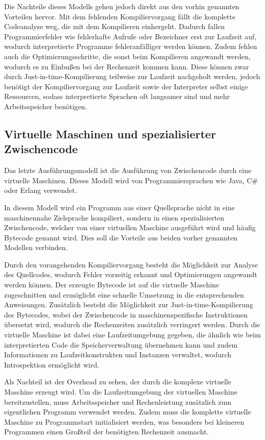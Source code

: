 \documentclass[11pt, parskip=half]{scrartcl}       %
\begin{document}
Die Nachteile dieses Modells gehen jedoch direkt aus den vorhin genannten Vorteilen hervor.
Mit dem fehlenden Kompiliervorgang fällt die komplette Codeanalyse weg, die mit dem Kompilieren einhergeht.
Dadurch fallen Programmierfehler wie fehlerhafte Aufrufe oder Bezeichner erst zur Laufzeit auf, wodurch interpretierte Programme fehleranfälliger werden können.
Zudem fehlen auch die Optimierungsschritte, die sonst beim Kompilieren angewandt werden, wodurch es zu Einbußen bei der Rechenzeit kommen kann.
Diese können zwar durch Just-in-time-Kompilierung teilweise zur Laufzeit nachgeholt werden, jedoch benötigt der Kompiliervorgang zur Laufzeit sowie der Interpreter selbst einige Ressourcen, sodass interpretierte Sprachen oft langsamer sind und mehr Arbeitsspeicher benötigen.\cite{stackoverflow_pros_and_cons_interpreted_languages}

\subsection{Virtuelle Maschinen und spezialisierter Zwischencode}

Das letzte Ausführungsmodell ist die Ausführung von Zwischencode durch eine virtuelle Maschinen.
Dieses Modell wird von Programmiersprachen wie Java, C\# oder Erlang verwendet.

In diesem Modell wird ein Programm aus einer Quellsprache nicht in eine maschinennahe Zielsprache kompiliert, sondern in einen spezialisierten Zwischencode, welcher von einer virtuellen Maschine ausgeführt wird und häufig Bytecode genannt wird.
Dies soll die Vorteile aus beiden vorher genannten Modellen verbinden.

Durch den vorangehenden Kompiliervorgang besteht die Möglichkeit zur Analyse des Quellcodes, wodurch Fehler vorzeitig erkannt und Optimierungen angewandt werden können.
Der erzeugte Bytecode ist auf die virtuelle Maschine zugeschnitten und ermöglicht eine schnelle Umsetzung in die entsprechenden Anweisungen.
Zusätzlich besteht die Möglichkeit zur Just-in-time-Kompilierung des Bytecodes, wobei der Zwischencode in maschinenspezifische Instruktionen übersetzt wird, wodurch die Rechenzeiten zusätzlich verringert werden.
Durch die virtuelle Maschine ist dabei eine Laufzeitumgebung gegeben, die ähnlich wie beim interpretierten Code die Speicherverwaltung übernehmen kann und zudem Informationen zu Laufzeitkonstrukten und Instanzen verwaltet, wodurch Introspektion ermöglicht wird.

Als Nachteil ist der Overhead zu sehen, der durch die komplexe virtuelle Maschine erzeugt wird.
Um die Laufzeitumgebung der virtuellen Maschine bereitzustellen, muss Arbeitsspeicher und Rechenleistung zusätzlich zum eigentlichen Programm verwendet werden.
Zudem muss die komplette virtuelle Maschine zu Programmstart initialisiert werden, was besonders bei kleineren Programmen einen Großteil der benötigten Rechenzeit ausmacht.
\end{document}
